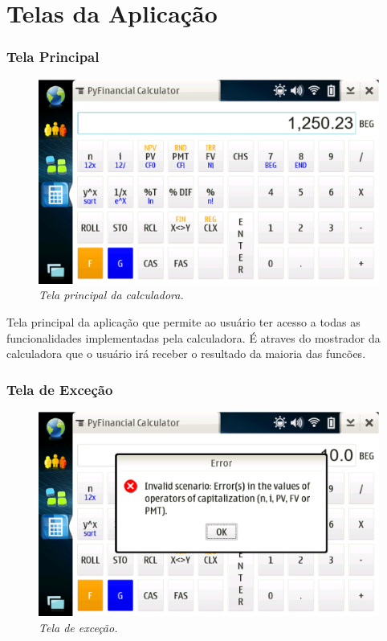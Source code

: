 \chapter{Telas da Aplicação}

\subsection{Tela Principal}

\begin{figure}[!h]
 \includegraphics[scale=0.55]{tela_principal.eps}
 \caption{\it Tela principal da calculadora.} \label{tab:tela_principal}
\end{figure}

Tela principal da aplicação que permite ao usuário ter acesso a todas as funcionalidades
implementadas pela calculadora. É atraves do mostrador da calculadora que o usuário irá
receber o resultado da maioria das funcões.

\subsection{Tela de Exceção}

\begin{figure}[!h]
 \includegraphics[scale=0.55]{tela_error.eps}
 \caption{\it Tela de exceção.} \label{tab:tela_error}
\end{figure}

